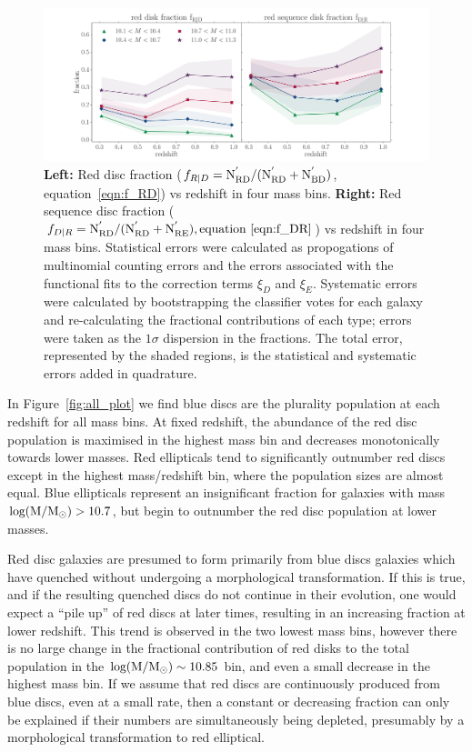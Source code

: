 \documentclass[useAMS,usenatbib]{mn2e}
\begin{document}
\begin{figure}
\centering
\includegraphics[width=\textwidth,trim={0cm 0cm 2cm 1cm},clip]{figures/red_disk_fractions.pdf}
\caption{\textbf{Left:} Red disc fraction ($f_{R|D} = \rm N^{'}_{RD}/(N^{'}_{RD}+N^{'}_{BD})$, equation~\ref{eqn:f_RD}) vs redshift in four mass bins. \textbf{Right:} Red sequence disc fraction ($f_{D|R} = \rm N^{'}_{RD}/(N^{'}_{RD}+N^{'}_{RE}), equation~\ref{eqn:f_DR}$) vs redshift in four mass bins. Statistical errors were calculated as propogations of multinomial counting errors and the errors associated with the functional fits to the correction terms $\xi_D$ and $\xi_E$. Systematic errors were calculated by bootstrapping the classifier votes for each galaxy and re-calculating the fractional contributions of each type; errors were taken as the $1\sigma$ dispersion in the fractions. The total error, represented by the shaded regions, is the statistical and systematic errors added in quadrature.} 
\label{fig:f_results}
\end{figure}


In Figure~\ref{fig:all_plot} we find blue discs are the plurality population at each redshift for all mass bins. At fixed redshift, the abundance of the red disc population is maximised in the highest mass bin and decreases monotonically towards lower masses. Red ellipticals tend to significantly outnumber red discs except in the highest mass/redshift bin, where the population sizes are almost equal. Blue ellipticals represent an insignificant fraction for galaxies with mass $\rm log(M/M_{\odot})>10.7$, but begin to outnumber the red disc population at lower masses. 


Red disc galaxies are presumed to form primarily from blue discs galaxies which have quenched without undergoing a morphological transformation. If this is true, and if the resulting quenched discs do not continue in their evolution, one would expect a ``pile up'' of red discs at later times, resulting in an increasing fraction at lower redshift. This trend is observed in the two lowest mass bins, however there is no large change in the fractional contribution of red disks to the total population in the $\rm log(M/M_{\odot})\sim10.85$ bin, and even a small decrease in the highest mass bin. If we assume that red discs are continuously produced from blue discs, even at a small rate, then a constant or decreasing fraction can only be explained if their numbers are simultaneously being depleted, presumably by a morphological transformation to red elliptical.
\end{document}

